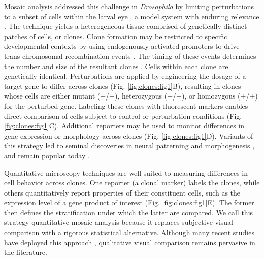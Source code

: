 Mosaic analysis addressed this challenge in \textit{Drosophila} by limiting perturbations to a subset of cells within the larval eye \cite{Xu1993,Xu2012}, a model system with enduring relevance \cite{Beira2016}. The technique yields a heterogeneous tissue comprised of genetically distinct patches of cells, or clones. Clone formation may be restricted to specific developmental contexts by using endogenously-activated promoters to drive trans-chromosomal recombination events \cite{Newsome2000,Theodosiou1998}. The timing of these events determines the number and size of the resultant clones \cite{Struhl1993}. Cells within each clone are genetically identical. Perturbations are applied by engineering the dosage of a target gene to differ across clones (Fig. \ref{fig:clones:fig1}B), resulting in clones whose cells are either mutant (−/−), heterozygous (+/−), or homozygous (+/+) for the perturbed gene. Labeling these clones with fluorescent markers enables direct comparison of cells subject to control or perturbation conditions (Fig. \ref{fig:clones:fig1}C). Additional reporters may be used to monitor differences in gene expression or morphology across clones (Fig. \ref{fig:clones:fig1}D). Variants of this strategy led to seminal discoveries in neural patterning \cite{Halfar2001,Tomlinson2001,Yang2001} and morphogenesis \cite{Huang2005,Thompson2006}, and remain popular today \cite{Atkins2019,Enomoto2018,Germani2018}.

Quantitative microscopy techniques are well suited to measuring differences in cell behavior across clones. One reporter (a clonal marker) labels the clones, while others quantitatively report properties of their constituent cells, such as the expression level of a gene product of interest (Fig. \ref{fig:clones:fig1}E). The former then defines the stratification under which the latter are compared. We call this strategy quantitative mosaic analysis because it replaces subjective visual comparison with a rigorous statistical alternative. Although many recent studies have deployed this approach \cite{Bernasek2018,Burrous2017,Ghiglione2018,Li2018}, qualitative visual comparison remains pervasive in the literature.

